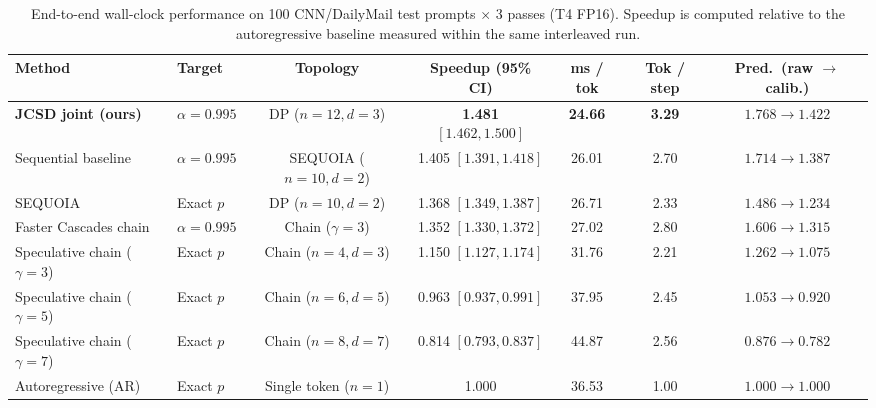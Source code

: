 \documentclass[10pt]{article}
\begin{document}
\begin{table}[h]
  \caption{End-to-end wall-clock performance on 100 CNN/DailyMail test prompts $\times$ 3 passes (T4 FP16). Speedup is computed relative to the autoregressive baseline measured within the same interleaved run.}
  \label{tab:e2e}
  \centering
  \begin{adjustbox}{max width=\linewidth}
  \begin{tabular}{llccccc}
    \toprule
    Method & Target & Topology & Speedup (95\% CI) & ms / tok & Tok / step & Pred.\ (raw $\to$ calib.) \\
    \midrule
    \textbf{JCSD joint (ours)} & $\alpha = 0.995$ & DP ($n=12, d=3$) & \textbf{1.481} $[1.462, 1.500]$ & \textbf{24.66} & \textbf{3.29} & $1.768 \to 1.422$ \\
    Sequential baseline & $\alpha = 0.995$ & SEQUOIA ($n=10, d=2$) & 1.405 $[1.391, 1.418]$ & 26.01 & 2.70 & $1.714 \to 1.387$ \\
    SEQUOIA & Exact $p$ & DP ($n=10, d=2$) & 1.368 $[1.349, 1.387]$ & 26.71 & 2.33 & $1.486 \to 1.234$ \\
    Faster Cascades chain & $\alpha = 0.995$ & Chain ($\gamma = 3$) & 1.352 $[1.330, 1.372]$ & 27.02 & 2.80 & $1.606 \to 1.315$ \\
    Speculative chain ($\gamma=3$) & Exact $p$ & Chain ($n=4, d=3$) & 1.150 $[1.127, 1.174]$ & 31.76 & 2.21 & $1.262 \to 1.075$ \\
    Speculative chain ($\gamma=5$) & Exact $p$ & Chain ($n=6, d=5$) & 0.963 $[0.937, 0.991]$ & 37.95 & 2.45 & $1.053 \to 0.920$ \\
    Speculative chain ($\gamma=7$) & Exact $p$ & Chain ($n=8, d=7$) & 0.814 $[0.793, 0.837]$ & 44.87 & 2.56 & $0.876 \to 0.782$ \\
    Autoregressive (AR) & Exact $p$ & Single token ($n=1$) & 1.000 & 36.53 & 1.00 & $1.000 \to 1.000$ \\
    \bottomrule
  \end{tabular}
  \end{adjustbox}
  \vspace{11pt}
\end{table}
\end{document}
